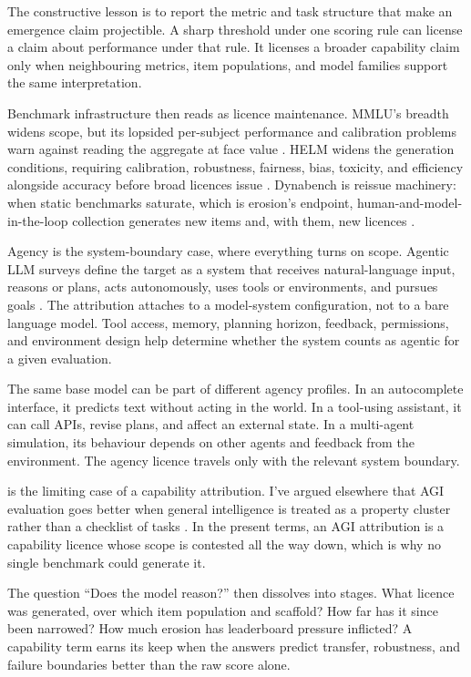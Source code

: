 \documentclass[12pt]{article}
\begin{document}
The constructive lesson is to report the metric and task structure that make an
emergence claim projectible. A sharp threshold under one scoring rule can license
a claim about performance under that rule. It licenses a broader capability
claim only when neighbouring metrics, item populations, and model families
support the same interpretation.

Benchmark infrastructure then reads as licence maintenance. MMLU's breadth
widens scope, but its lopsided per-subject performance and calibration problems
warn against reading the aggregate at face value \citep{hendrycks2020measuring}.
HELM widens the generation conditions, requiring calibration, robustness,
fairness, bias, toxicity, and efficiency alongside accuracy before broad
licences issue \citep{liang2023holistic}. Dynabench is reissue machinery: when
static benchmarks saturate, which is erosion's endpoint,
human-and-model-in-the-loop collection generates new items and, with them, new
licences \citep{kiela2021dynabench}.

Agency is the system-boundary case, where everything turns on scope. Agentic LLM
surveys define the target as a system that receives natural-language input,
reasons or plans, acts autonomously, uses tools or environments, and pursues
goals \citep{plaat2025agentic}. The attribution attaches to a
model-system configuration, not to a bare language model. Tool access,
memory, planning horizon, feedback, permissions, and environment design help
determine whether the system counts as agentic for a given evaluation.

The same base model can be part of different agency profiles. In an autocomplete
interface, it predicts text without acting in the world. In a tool-using
assistant, it can call APIs, revise plans, and affect an external state. In a
multi-agent simulation, its behaviour depends on other agents and feedback from
the environment. The agency licence travels only with the relevant system
boundary.

 is the limiting case of a capability attribution. I've argued
elsewhere that AGI evaluation goes better when general intelligence is treated
as a property cluster rather than a checklist of tasks \citep{reynolds2025agi}.
In the present terms, an AGI attribution is a capability licence whose scope is
contested all the way down, which is why no single benchmark could generate it.

The question \enquote{Does the model reason?} then dissolves into stages. What
licence was generated, over which item population and scaffold? How far has it
since been narrowed? How much erosion has leaderboard pressure inflicted? A
capability term earns its keep when the answers predict transfer, robustness,
and failure boundaries better than the raw score alone.
\end{document}
